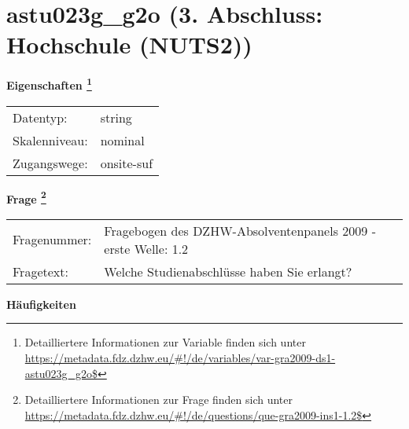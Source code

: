 
    \setcounter{footnote}{0}

    \vspace*{-1.8cm}
	\section{astu023g\_g2o (3. Abschluss: Hochschule (NUTS2))}
	\label{section:astu023g_g2o}



    \vspace*{0.5cm}
    \noindent\textbf{Eigenschaften
	\footnote{Detailliertere Informationen zur Variable finden sich unter
		\url{https://metadata.fdz.dzhw.eu/\#!/de/variables/var-gra2009-ds1-astu023g_g2o$}}}\\
	\begin{tabularx}{\hsize}{@{}lX}
	Datentyp: & string \\
	Skalenniveau: & nominal \\
	Zugangswege: &
	  onsite-suf
 \\
    \end{tabularx}



				\vspace*{0.5cm}
                \noindent\textbf{Frage
	                \footnote{Detailliertere Informationen zur Frage finden sich unter
		              \url{https://metadata.fdz.dzhw.eu/\#!/de/questions/que-gra2009-ins1-1.2$}}}\\
				\begin{tabularx}{\hsize}{@{}lX}
					Fragenummer: &
					  Fragebogen des DZHW-Absolventenpanels 2009 - erste Welle:
					  1.2
 \\
					Fragetext: & Welche Studienabschlüsse haben Sie erlangt? \\
				\end{tabularx}





        		\vspace*{0.5cm}
                \noindent\textbf{Häufigkeiten}

